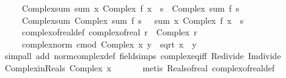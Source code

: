 \begin{isabellebody}
\ \ \ \ \ Complex{\isacharunderscore}{\kern0pt}sum{\isacharprime}{\kern0pt}{\isacharcolon}{\kern0pt}\ {\isachardoublequoteopen}sum\ {\isacharparenleft}{\kern0pt}{\isasymlambda}x{\isachardot}{\kern0pt}\ Complex\ {\isacharparenleft}{\kern0pt}f\ x{\isacharparenright}{\kern0pt}\ {}{\isacharparenright}{\kern0pt}\ s\ {\isacharequal}{\kern0pt}\ Complex\ {\isacharparenleft}{\kern0pt}sum\ f\ s{\isacharparenright}{\kern0pt}\ {}{\isachardoublequoteclose}\isanewline
\ \ \ \ \ Complex{\isacharunderscore}{\kern0pt}sum{\isacharcolon}{\kern0pt}\ {\isachardoublequoteopen}Complex\ {\isacharparenleft}{\kern0pt}sum\ f\ s{\isacharparenright}{\kern0pt}\ {}\ {\isacharequal}{\kern0pt}\ sum\ {\isacharparenleft}{\kern0pt}{\isasymlambda}x{\isachardot}{\kern0pt}\ Complex\ {\isacharparenleft}{\kern0pt}f\ x{\isacharparenright}{\kern0pt}\ {}{\isacharparenright}{\kern0pt}\ s{\isachardoublequoteclose}\isanewline
\ \ \ \ \ complex{\isacharunderscore}{\kern0pt}of{\isacharunderscore}{\kern0pt}real{\isacharunderscore}{\kern0pt}def{\isacharcolon}{\kern0pt}\ {\isachardoublequoteopen}complex{\isacharunderscore}{\kern0pt}of{\isacharunderscore}{\kern0pt}real\ r\ {\isacharequal}{\kern0pt}\ Complex\ r\ {}{\isachardoublequoteclose}\isanewline
\ \ \ \ \ complex{\isacharunderscore}{\kern0pt}norm{\isacharcolon}{\kern0pt}\ {\isachardoublequoteopen}cmod\ {\isacharparenleft}{\kern0pt}Complex\ x\ y{\isacharparenright}{\kern0pt}\ {\isacharequal}{\kern0pt}\ sqrt\ {\isacharparenleft}{\kern0pt}x\ {\isacharplus}{\kern0pt}\ y\isanewline
%
\isadelimproof
\ \ %
\endisadelimproof
%
\isatagproof
{}\isamarkupfalse%
\ {\isacharparenleft}{\kern0pt}simp{\isacharunderscore}{\kern0pt}all\ add{\isacharcolon}{\kern0pt}\ norm{\isacharunderscore}{\kern0pt}complex{\isacharunderscore}{\kern0pt}def\ field{\isacharunderscore}{\kern0pt}simps\ complex{\isacharunderscore}{\kern0pt}eq{\isacharunderscore}{\kern0pt}iff\ Re{\isacharunderscore}{\kern0pt}divide\ Im{\isacharunderscore}{\kern0pt}divide{\isacharparenright}{\kern0pt}%
\endisatagproof
{\isafoldproof}%
%
\isadelimproof
\isanewline
%
\endisadelimproof
\isanewline
{}\isamarkupfalse%
\ Complex{\isacharunderscore}{\kern0pt}in{\isacharunderscore}{\kern0pt}Reals{\isacharcolon}{\kern0pt}\ {\isachardoublequoteopen}Complex\ x\ {}\ {\isasymin}\ {\isasymreal}{\isachardoublequoteclose}\isanewline
%
\isadelimproof
\ \ %
\endisadelimproof
%
\isatagproof
{}\isamarkupfalse%
\ {\isacharparenleft}{\kern0pt}metis\ Reals{\isacharunderscore}{\kern0pt}of{\isacharunderscore}{\kern0pt}real\ complex{\isacharunderscore}{\kern0pt}of{\isacharunderscore}{\kern0pt}real{\isacharunderscore}{\kern0pt}def{\isacharparenright}{\kern0pt}%
\endisatagproof
{\isafoldproof}%
%
\isadelimproof
\isanewline
%
\endisadelimproof
%
\isadelimtheory
\isanewline
%
\endisadelimtheory
%
\isatagtheory
{}\isamarkupfalse%
%
\endisatagtheory
{\isafoldtheory}%
%
\isadelimtheory
%
\endisadelimtheory
%
\end{isabellebody}%
